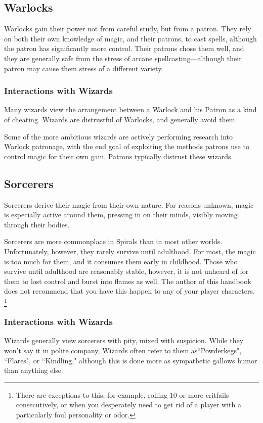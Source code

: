 \begin{multicols}{2}
\subsection{Warlocks}

Warlocks gain their power not from careful study, but from a patron.
They rely on both their own knowledge of magic, and their patrons, to cast spells, although the patron has significantly more control.
Their patrons chose them well, and they are generally safe from the stress of arcane spellcasting---although their patron may cause them stress of a different variety. 

\subsubsection{Interactions with Wizards}
Many wizards view the arrangement between a Warlock and his Patron as a kind of cheating.
Wizards are distrustful of Warlocks, and generally avoid them.

Some of the more ambitious wizards are actively performing research into Warlock patronage, with the end goal of exploiting the methods patrons use to control magic for their own gain.
Patrons typically distrust these wizards.

\subsection{Sorcerers}
Sorcerers derive their magic from their own nature.
For reasons unknown, magic is especially active around them, pressing in on their minds, visibly moving through their bodies.

Sorcerers are more commonplace in Spirals than in most other worlds.
Unfortunately, however, they rarely survive until adulthood.
For most, the magic is too much for them, and it consumes them early in childhood.
Those who survive until adulthood are reasonably stable, however, it is not unheard of for them to lost control and burst into flames as well.
The author of this handbook does not recommend that you have this happen to any of your player characters.
\footnote{There are exceptions to this, for example, rolling 10 or more critfails consecutively, or when you desperately need to get rid of a player with a particularly foul personality or odor.}



\subsubsection{Interactions with Wizards}
Wizards generally view sorcerers with pity, mixed with suspicion.
While they won't say it in polite company, Wizards often refer to them as``Powderkegs", ``Flares", or ``Kindling," although this is done more as sympathetic gallows humor than anything else.


\end{multicols}
